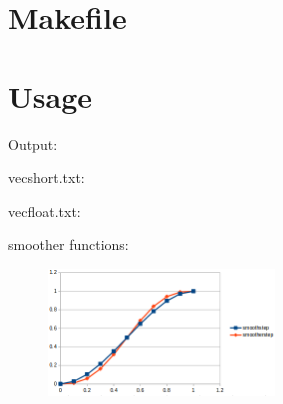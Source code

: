 \documentclass[12pt, a4paper]{article}
\begin{document}
\section{Makefile}

\begin{scriptsize}
\begin{ttfamily}

\end{ttfamily}
\end{scriptsize}

\section{Usage}

\begin{scriptsize}
\begin{ttfamily}

\end{ttfamily}
\end{scriptsize}

Output:\\
\begin{scriptsize}
\begin{ttfamily}

\end{ttfamily}
\end{scriptsize}

vecshort.txt:\\
\begin{scriptsize}
\begin{ttfamily}

\end{ttfamily}
\end{scriptsize}

vecfloat.txt:\\
\begin{scriptsize}
\begin{ttfamily}

\end{ttfamily}
\end{scriptsize}

smoother functions:\\
\begin{center}
\begin{figure}[H]
\centering\includegraphics[width=6cm]{./smoother.png}\\
\end{figure}
\end{center}
\end{document}
